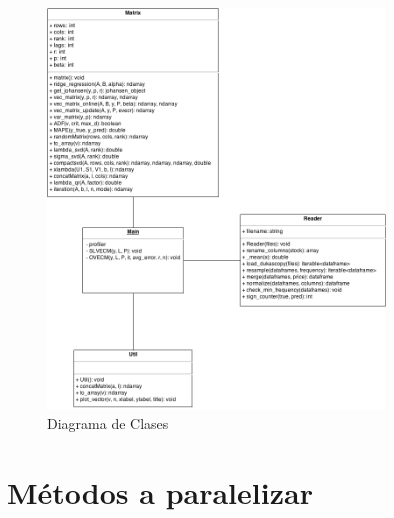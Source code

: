 \begin{figure}[h!t]
    \begin{center}
        \includegraphics[width=0.8\textwidth]{images/class_diagram.png}
        \caption{Diagrama de Clases}
        \label{fig:class_diagram}
    \end{center}
\end{figure}

\section{Métodos a paralelizar}
